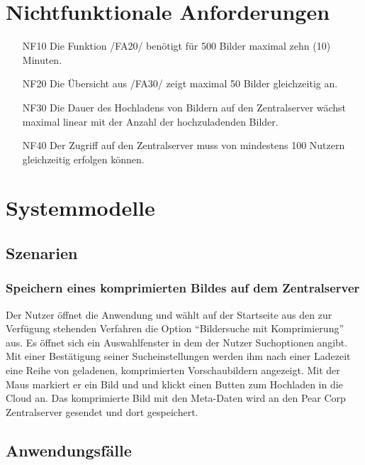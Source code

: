 \documentclass[parskip=full]{scrartcl}
\begin{document}
\section{Nichtfunktionale Anforderungen}
\begin{itemize}[nosep]
\item[NF10] Die Funktion /FA20/ benötigt für 500 Bilder maximal zehn (10) Minuten.
\item[NF20] Die Übersicht aus /FA30/ zeigt maximal 50 Bilder gleichzeitig an.
\item[NF30] Die Dauer des Hochladens von Bildern auf den Zentralserver wächst maximal linear mit der Anzahl der hochzuladenden Bilder.
\item[NF40] Der Zugriff auf den Zentralserver muss von mindestens 100 Nutzern gleichzeitig erfolgen können.
\end{itemize}

\section{Systemmodelle}

\subsection{Szenarien}
\subsubsection{Speichern eines komprimierten Bildes auf dem Zentralserver}
Der Nutzer öffnet die Anwendung und wählt auf der Startseite aus den zur Verfügung stehenden Verfahren die Option \enquote{Bildersuche mit Komprimierung} aus. Es öffnet sich ein Auswahlfenster in dem der Nutzer Suchoptionen angibt. Mit einer Bestätigung seiner Sucheinstellungen werden ihm nach einer Ladezeit eine Reihe von geladenen, komprimierten Vorschaubildern angezeigt. Mit der Maus markiert er ein Bild und und klickt einen Butten zum Hochladen in die \Gls{Cloud} an. Das komprimierte Bild mit den \Gls{Meta-Daten} wird an den Pear Corp Zentralserver gesendet und dort gespeichert.

\subsection{Anwendungsfälle}
\end{document}
